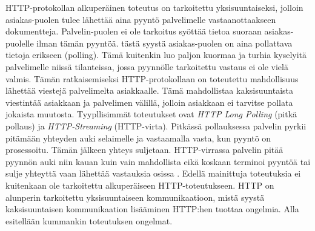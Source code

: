 \documentclass[utf8]{gradu3}
\begin{document}
HTTP-protokollan alkuperäinen toteutus on tarkoitettu yksisuuntaiseksi, jolloin asiakas-puolen tulee lähettää aina pyyntö palvelimelle vastaanottaakseen dokumentteja. Palvelin-puolen ei ole tarkoitus syöttää tietoa suoraan asiakas-puolelle ilman tämän pyyntöä. tästä syystä asiakas-puolen on aina pollattava tietoja erikseen (polling). Tämä kuitenkin luo paljon kuormaa ja turhia kyselyitä palvelimelle niissä tilanteissa, jossa pyynnölle tarkoitettu vastaus ei ole vielä valmis. Tämän ratkaisemiseksi HTTP-protokollaan on toteutettu mahdollisuus lähettää viestejä palvelimelta asiakkaalle. Tämä mahdollistaa kaksisuuntaista viestintää asiakkaan ja palvelimen välillä, jolloin asiakkaan ei tarvitse pollata jokaista muutosta. Tyypllisimmät toteutukset ovat \emph{HTTP Long Polling} (pitkä pollaus) ja \emph{HTTP-Streaming} (HTTP-virta). Pitkässä pollauksessa palvelin pyrkii pitämään yhteyden auki selaimelle ja vastaamalla vasta, kun pyyntö on prosessoitu. Tämän jälkeen yhteys suljetaan. HTTP-virrassa palvelin pitää pyynnön auki niin kauan kuin vain mahdollista eikä koskaan terminoi pyyntöä tai sulje yhteyttä vaan lähettää vastauksia osissa \parencite[s. 2]{long_polling}. Edellä mainittuja toteutuksia ei kuitenkaan ole tarkoitettu alkuperäiseen HTTP-toteutukseen. HTTP on alunperin tarkoitettu yksisuuntaiseen kommunikaatioon, mistä syystä kaksisuuntaisen kommunikaation lisääminen HTTP:hen tuottaa ongelmia. Alla esitellään kummankin toteutuksen ongelmat.
\end{document}

